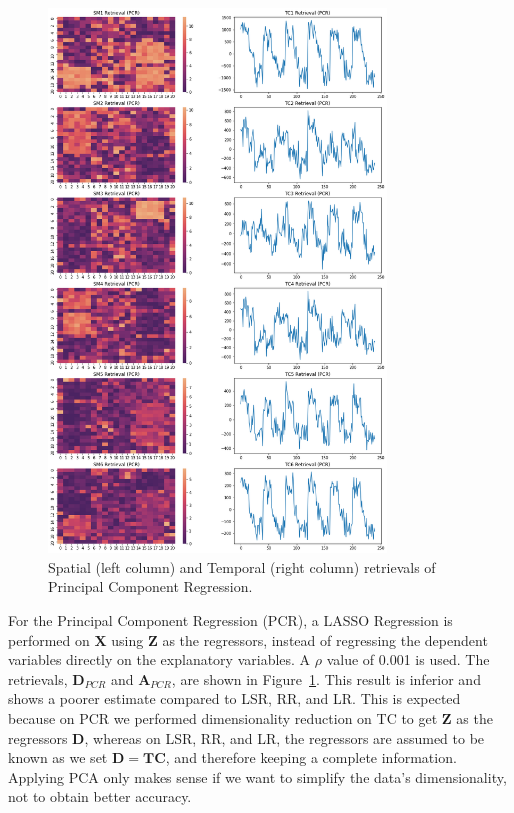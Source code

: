 \documentclass[11pt]{article}
\def\*#1{\mathbf{#1}}
\begin{document}
    \begin{figure}[H]
        \begin{center}
            \includegraphics[width=0.8\textwidth]{../plots/2_5_PCR_retrievals}
        \caption{Spatial (left column) and Temporal (right column) retrievals of Principal Component Regression.}
        \label{fig:pcr_retrievals}
        \end{center}
    \end{figure}

For the Principal Component Regression (PCR), a LASSO Regression is performed on $\*X$ using $\*Z$ as the regressors, instead of regressing the dependent variables directly on the explanatory variables. A $\rho$ value of 0.001 is used. The retrievals, $\*D_{PCR}$ and $\*A_{PCR}$, are shown in Figure~\ref{fig:pcr_retrievals}. This result is inferior and shows a poorer estimate compared to LSR, RR, and LR. This is expected because on PCR we performed dimensionality reduction on TC to get $\*Z$ as the regressors $\*D$, whereas on LSR, RR, and LR, the regressors are assumed to be known as we set $\*D = \*{TC}$, and therefore keeping a complete information. Applying PCA only makes sense if we want to simplify the data's dimensionality, not to obtain better accuracy.
\end{document}
